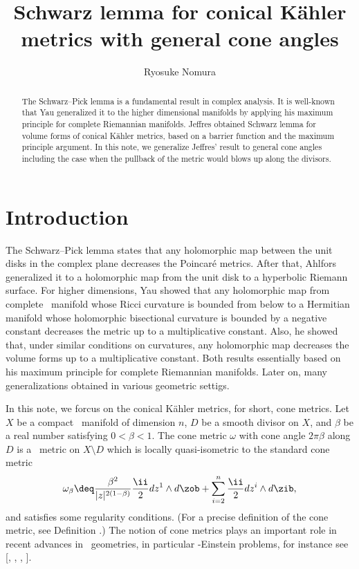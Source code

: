 \documentclass[12pt]{amsart}
\title[Schwarz lemma for conical K\"ahler metrics]
{Schwarz lemma for conical K\"ahler metrics with general cone angles}
\author
{Ryosuke Nomura}
\begin{document}
	
\begin{abstract}
	The Schwarz--Pick lemma is a fundamental result in complex analysis. 
	It is well-known that Yau generalized it to the higher dimensional manifolds by applying his maximum principle for complete Riemannian manifolds. 
	Jeffres obtained Schwarz lemma for volume forms of conical K\"ahler metrics, based on a barrier function and the maximum principle argument. 
	In this note, we generalize Jeffres' result to general cone angles including the case when the pullback of the metric would blows up along the divisors.
\end{abstract}
\maketitle 
	
\section{Introduction}

The Schwarz--Pick lemma states that any holomorphic map between the unit disks in the complex plane decreases the Poincar\'e metrics. 
After that, Ahlfors \citep{Ahlfors39Schwarz} generalized it to a holomorphic map from the unit disk to a hyperbolic Riemann surface.
For higher dimensions, Yau \citep{Yau78Schwarz} showed that any holomorphic map from complete \kahler \ manifold whose Ricci curvature is bounded from below to a Hermitian manifold whose holomorphic bisectional curvature is bounded by a negative constant decreases the metric up to a multiplicative constant. Also, he showed that, under similar conditions on curvatures, any holomorphic map decreases the volume forms up to a multiplicative constant. 
Both results essentially based on his maximum principle for complete Riemannian manifolds. 
Later on, many generalizations obtained in various geometric settigs. 

In this note, we forcus on the conical K\"ahler metrics, for short, cone metrics. 
Let $X$ be a compact \kahler \ manifold of dimension $n$, $D$ be a smooth divisor on $X$, and $\beta $ be a real number satisfying $0< \beta<1$. The cone metric $\omega$ with cone angle $2\pi \beta $ along $D$ is a \kahler \ metric on $X\setminus D$ which is locally quasi-isometric to the standard cone metric
\begin{align*}
	\omega_\beta  \deq \dfrac{\beta ^2}{|z|^{2(1-\beta )}}\dfrac{\ii}{2} dz^1 \wedge d\zob  + \sum_{i=2}^n \dfrac{\ii}{2}  dz^i \wedge d\zib ,
\end{align*}
and satisfies some regularity conditions. (For a precise definition of the cone metric, see Definition .)
The notion of cone metrics plays an important role in recent advances in \kahler \ geometries, in particular \kahler -Einstein problems, for instance see [\citet{CDSI}, \citet{CDSII}, \citet{CDSIII}, \citet{Tian}].
\end{document}

